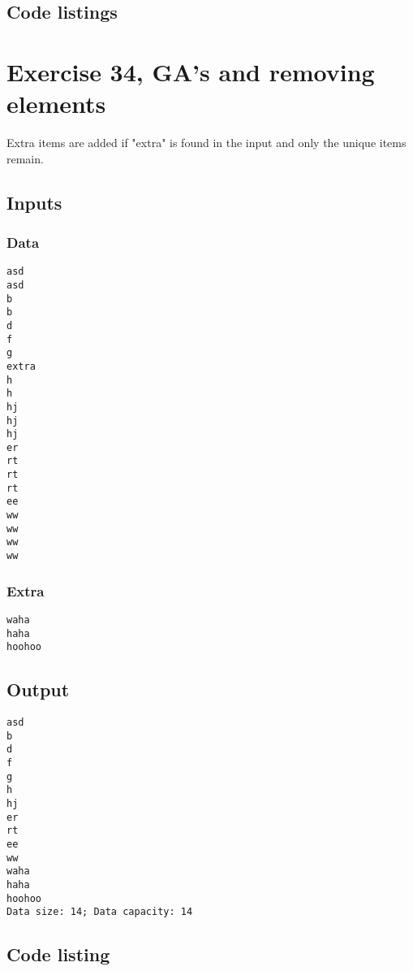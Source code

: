 \documentclass[11pt]{article}
\begin{document}
\subsection*{Code listings}








\section*{Exercise 34, GA's and removing elements}
Extra items are added if "extra" is found in the input and only the unique items remain.

\subsection*{Inputs}
\subsubsection*{Data}
\begin{lstlisting}
asd
asd
b
b
d
f
g
extra
h
h
hj
hj
hj
er
rt
rt
rt
ee
ww
ww
ww
ww
\end{lstlisting}

\subsubsection*{Extra}
\begin{lstlisting}
waha
haha
hoohoo
\end{lstlisting}

\subsection*{Output}
\begin{lstlisting}
asd
b
d
f
g
h
hj
er
rt
ee
ww
waha
haha
hoohoo
Data size: 14; Data capacity: 14
\end{lstlisting}

\subsection*{Code listing}

\end{document}
